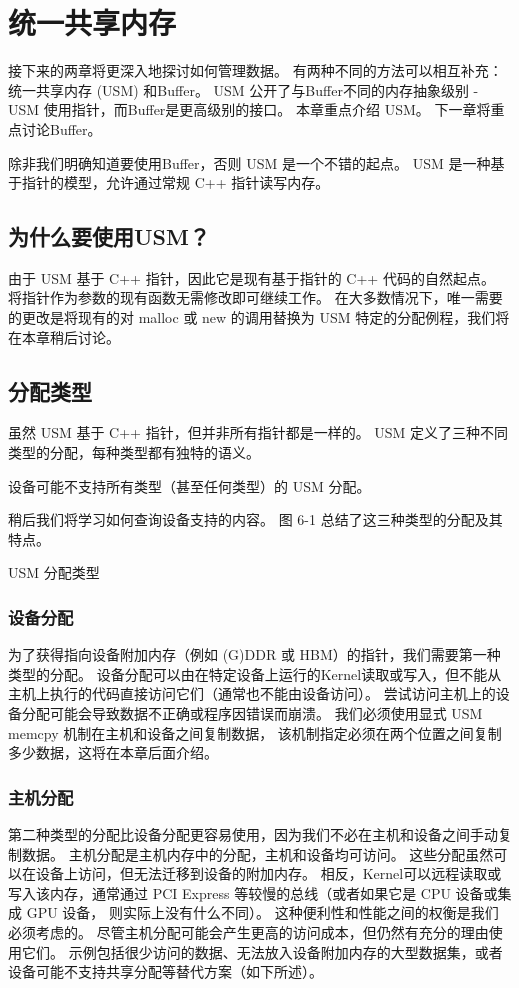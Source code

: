 \section{统一共享内存}
接下来的两章将更深入地探讨如何管理数据。 有两种不同的方法可以相互补充：统一共享内存 (USM) 和Buffer。 
USM 公开了与Buffer不同的内存抽象级别 - USM 使用指针，而Buffer是更高级别的接口。 
本章重点介绍 USM。 下一章将重点讨论Buffer。

除非我们明确知道要使用Buffer，否则 USM 是一个不错的起点。 
USM 是一种基于指针的模型，允许通过常规 C++ 指针读写内存。

\subsection{为什么要使用USM？}
由于 USM 基于 C++ 指针，因此它是现有基于指针的 C++ 代码的自然起点。 
将指针作为参数的现有函数无需修改即可继续工作。 
在大多数情况下，唯一需要的更改是将现有的对 malloc 或 new 的调用替换为 USM 特定的分配例程，我们将在本章稍后讨论。

\subsection{分配类型}
虽然 USM 基于 C++ 指针，但并非所有指针都是一样的。 USM 定义了三种不同类型的分配，每种类型都有独特的语义。

设备可能不支持所有类型（甚至任何类型）的 USM 分配。

稍后我们将学习如何查询设备支持的内容。 图 6-1 总结了这三种类型的分配及其特点。

{\color{red} USM 分配类型}

\subsubsection{设备分配}
为了获得指向设备附加内存（例如 (G)DDR 或 HBM）的指针，我们需要第一种类型的分配。 
设备分配可以由在特定设备上运行的Kernel读取或写入，但不能从主机上执行的代码直接访问它们（通常也不能由设备访问）。 
尝试访问主机上的设备分配可能会导致数据不正确或程序因错误而崩溃。 
我们必须使用显式 USM memcpy 机制在主机和设备之间复制数据，
该机制指定必须在两个位置之间复制多少数据，这将在本章后面介绍。

\subsubsection{主机分配}
第二种类型的分配比设备分配更容易使用，因为我们不必在主机和设备之间手动复制数据。 
主机分配是主机内存中的分配，主机和设备均可访问。 这些分配虽然可以在设备上访问，但无法迁移到设备的附加内存。 
相反，Kernel可以远程读取或写入该内存，通常通过 PCI Express 等较慢的总线（或者如果它是 CPU 设备或集成 GPU 设备，
则实际上没有什么不同）。 这种便利性和性能之间的权衡是我们必须考虑的。 
尽管主机分配可能会产生更高的访问成本，但仍然有充分的理由使用它们。 
示例包括很少访问的数据、无法放入设备附加内存的大型数据集，或者设备可能不支持共享分配等替代方案（如下所述）。

